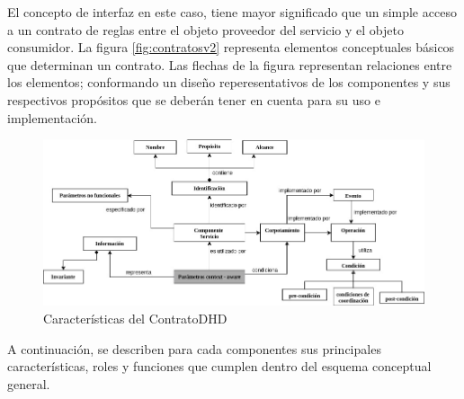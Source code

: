 El concepto de interfaz en este caso, tiene mayor significado que un simple acceso a un contrato de reglas entre el objeto proveedor del servicio y el objeto consumidor. La figura \ref{fig:contratosv2} representa elementos conceptuales básicos que determinan un contrato. Las flechas de la figura representan relaciones entre los elementos; conformando un diseño reperesentativos de los componentes y sus respectivos propósitos que se deberán tener en cuenta para su uso e implementación. 

\begin{figure}
\begin{center}
 \includegraphics [width=6 in,totalheight=3 in]{Ch4/contrato_conceptual}
\end{center}
\caption{Características del ContratoDHD}
\label{fig:contratov2}
\end{figure}

A continuación, se describen para cada componentes sus principales características, roles y funciones que cumplen dentro 
del esquema conceptual general.


